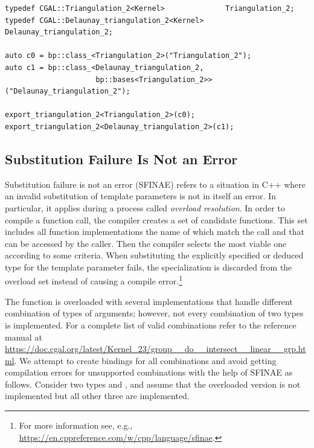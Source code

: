\begin{lstlisting}[style=cppNumberedStyle]
typedef CGAL::Triangulation_2<Kernel>              Triangulation_2;
typedef CGAL::Delaunay_triangulation_2<Kernel>     Delaunay_triangulation_2;

auto c0 = bp::class_<Triangulation_2>("Triangulation_2");
auto c1 = bp::class_<Delaunay_triangulation_2,
                     bp::bases<Triangulation_2>>("Delaunay_triangulation_2");

export_triangulation_2<Triangulation_2>(c0);
export_triangulation_2<Delaunay_triangulation_2>(c1);
\end{lstlisting}

\subsection{Substitution Failure Is Not an Error}
\label{sec:code:sfinae}
Substitution failure is not an error (SFINAE) refers to a situation in
C++ where an invalid substitution of template parameters is not in
itself an error. In particular, it applies during a process called
\emph{overload resolution}.  In order to compile a function call, the
compiler creates a set of candidate functions. This set includes all
function implementations the name of which match the call and that can
be accessed by the caller. Then the compiler selects the most viable
one according to some criteria. When substituting the explicitly
specified or deduced type for the template parameter fails, the
specialization is discarded from the overload set instead of causing a
compile error.\footnote{For more information see, e.g.,
  \url{https://en.cppreference.com/w/cpp/language/sfinae}.}

The function  is overloaded
with several implementations that handle different combination of
types of arguments; however, not every combination of two types is
implemented. For a complete list of valid combinations refer to the
reference manual at
\url{https://doc.cgal.org/latest/Kernel_23/group__do__intersect__linear__grp.html}. We
attempt to create bindings for all combinations and avoid getting
compilation errors for unsupported combinations with the help of
SFINAE as follows. Consider two types  and
, and assume that the overloaded version
 is not
implemented but all other three are implemented.


